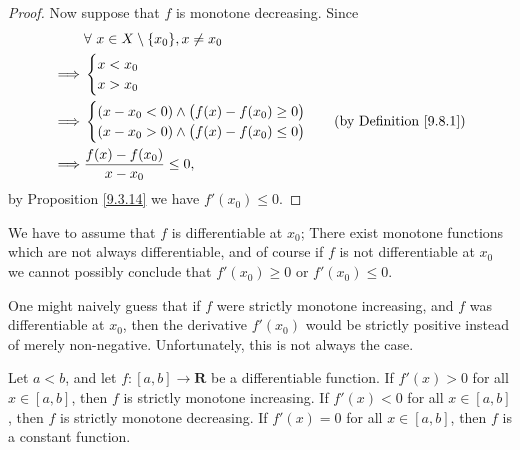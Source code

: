 \begin{proof}
    Now suppose that \(f\) is monotone decreasing.
    Since
    \begin{align*}
                 & \forall\ x \in X \setminus \{x_0\}, x \neq x_0                                      \\
        \implies & \begin{cases}
            x < x_0 \\
            x > x_0 \\
        \end{cases}                                                           \\
        \implies & \begin{cases}
            (x - x_0 < 0) \land \big(f(x) - f(x_0) \geq 0\big) \\
            (x - x_0 > 0) \land \big(f(x) - f(x_0) \leq 0\big) \\
        \end{cases}                      & \text{(by Definition \ref{9.8.1})} \\
        \implies & \frac{f(x) - f(x_0)}{x - x_0} \leq 0,
    \end{align*}
    by Proposition \ref{9.3.14} we have \(f'(x_0) \leq 0\).
\end{proof}

\begin{remark}\label{10.3.2}
    We have to assume that \(f\) is differentiable at \(x_0\);
    There exist monotone functions which are not always differentiable, and of course if \(f\) is not differentiable at \(x_0\) we cannot possibly conclude that \(f'(x_0) \geq 0\) or \(f'(x_0) \leq 0\).
\end{remark}

\begin{note}
    One might naively guess that if \(f\) were strictly monotone increasing, and \(f\) was differentiable at \(x_0\), then the derivative \(f'(x_0)\) would be strictly positive instead of merely non-negative.
    Unfortunately, this is not always the case.
\end{note}

\begin{proposition}\label{10.3.3}
    Let \(a < b\), and let \(f : [a, b] \to \mathbf{R}\) be a differentiable function.
    If \(f'(x) > 0\) for all \(x \in [a, b]\), then \(f\) is strictly monotone increasing.
    If \(f'(x) < 0\) for all \(x \in [a, b]\), then \(f\) is strictly monotone decreasing.
    If \(f'(x) = 0\) for all \(x \in [a, b]\), then \(f\) is a constant function.
\end{proposition}

